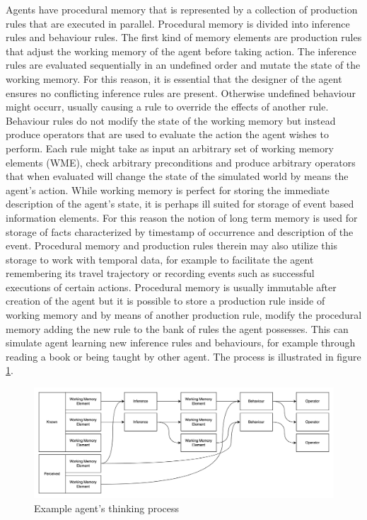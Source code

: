 Agents have procedural memory that is represented by a collection of production rules that are executed in parallel.
Procedural memory is divided into inference rules and behaviour rules.
The first kind of memory elements are production rules that adjust the working memory of the agent before taking action.
The inference rules are evaluated sequentially in an undefined order and mutate the state of the working memory.
For this reason, it is essential that the designer of the agent ensures no conflicting inference rules are present.
Otherwise undefined behaviour might occurr, usually causing a rule to override the effects of another rule.
Behaviour rules do not modify the state of the working memory but instead produce operators that are used to evaluate the action the agent wishes to perform.
Each rule might take as input an arbitrary set of working memory elements (WME), check arbitrary preconditions and produce arbitrary operators that when evaluated will change the state of the simulated world by means the agent's action.
While working memory is perfect for storing the immediate description of the agent's state, it is perhaps ill suited for storage of event based information elements.
For this reason the notion of long term memory is used for storage of facts characterized by timestamp of occurrence and description of the event.
Procedural memory and production rules therein may also utilize this storage to work with temporal data, for example to facilitate the agent remembering its travel trajectory or recording events such as successful executions of certain actions.
Procedural memory is usually immutable after creation of the agent but it is possible to store a production rule inside of working memory and by means of another production rule, modify the procedural memory adding the new rule to the bank of rules the agent possesses.
This can simulate agent learning new inference rules and behaviours, for example through reading a book or being taught by other agent.
The process is illustrated in figure \ref{fig:agent_think.drawio.png}.

\begin{figure}[H]
    \centering
    \includegraphics[width=1.0\textwidth]{images/chapter1/agent_think.drawio.png}
    \caption{Example agent's thinking process}\label{fig:agent_think.drawio.png}
\end{figure}

